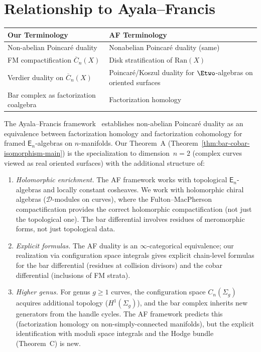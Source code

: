 \section{Relationship to Ayala--Francis}

\begin{tabular}{>{\raggedright\arraybackslash}p{}>{\raggedright\arraybackslash}p{}}
\textbf{Our Terminology} & \textbf{AF Terminology} \\
\hline
Non-abelian Poincar\'{e} duality & Nonabelian Poincar\'{e} duality (same) \\
FM compactification $\overline{C}_n(X)$ & Disk stratification of $\mathrm{Ran}(X)$ \\
Verdier duality on $\overline{C}_n(X)$ & Poincar\'{e}/Koszul duality for $\Etwo$-algebras on oriented surfaces \\
Bar complex as factorization coalgebra & Factorization homology \\
\end{tabular}

\begin{remark}\label{rem:ayala-francis-comparison}
The Ayala--Francis framework~\cite{AF15, AF20} establishes non-abelian
Poincar\'{e} duality as an equivalence between factorization homology and
factorization cohomology for framed $\mathsf{E}_n$-algebras on $n$-manifolds.
Our Theorem~A (Theorem~\ref{thm:bar-cobar-isomorphism-main}) is the
specialization to dimension~$n = 2$ (complex curves viewed as real
oriented surfaces) with the additional
structure of:
\begin{enumerate}[label=(\roman*)]
\item \emph{Holomorphic enrichment.}
  The AF framework works with topological $\mathsf{E}_n$-algebras and
  locally constant cosheaves.  We work with holomorphic chiral algebras
  ($\mathcal{D}$-modules on curves), where the Fulton--MacPherson
  compactification provides the correct holomorphic compactification
  (not just the topological one).  The bar differential involves
  residues of meromorphic forms, not just topological data.
\item \emph{Explicit formulas.}
  The AF duality is an $\infty$-categorical equivalence; our realization
  via configuration space integrals gives explicit chain-level formulas
  for the bar differential (residues at collision divisors) and the
  cobar differential (inclusions of FM strata).
\item \emph{Higher genus.}
  For genus $g \geq 1$ curves, the configuration space
  $C_n(\Sigma_g)$ acquires additional topology ($H^1(\Sigma_g)$),
  and the bar complex inherits new generators from the handle
  cycles.  The AF framework predicts this (factorization homology
  on non-simply-connected manifolds), but the explicit identification
  with moduli space integrals and the Hodge bundle (Theorem~C)
  is new.
\end{enumerate}
\end{remark}


